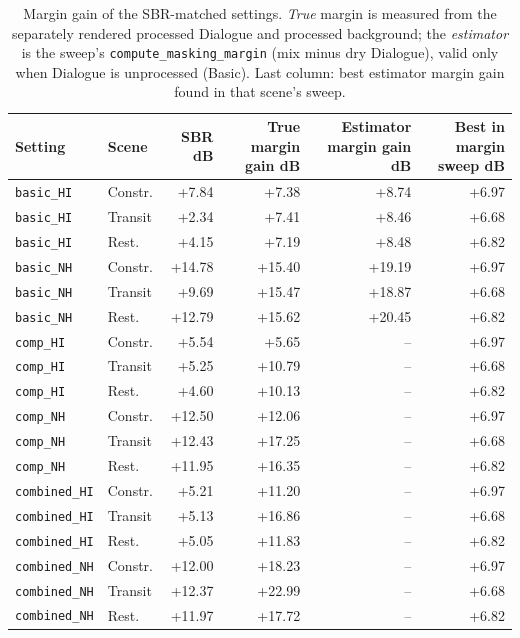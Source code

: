 \documentclass[11pt]{article}
\begin{document}
\begin{table}[H]\centering\scriptsize
\caption{Margin gain of the SBR-matched settings. \emph{True} margin is measured from the separately rendered processed Dialogue and processed background; the \emph{estimator} is the sweep's \texttt{compute\_masking\_margin} (mix minus dry Dialogue), valid only when Dialogue is unprocessed (Basic). Last column: best estimator margin gain found in that scene's sweep.}
\begin{tabular}{@{}llrrrr@{}}\toprule
Setting & Scene & SBR dB & True margin gain dB & Estimator margin gain dB & Best in margin sweep dB \\\midrule
\texttt{basic\_HI} & Constr. & +7.84 & +7.38 & +8.74 & +6.97 \\
\texttt{basic\_HI} & Transit & +2.34 & +7.41 & +8.46 & +6.68 \\
\texttt{basic\_HI} & Rest. & +4.15 & +7.19 & +8.48 & +6.82 \\
\midrule
\texttt{basic\_NH} & Constr. & +14.78 & +15.40 & +19.19 & +6.97 \\
\texttt{basic\_NH} & Transit & +9.69 & +15.47 & +18.87 & +6.68 \\
\texttt{basic\_NH} & Rest. & +12.79 & +15.62 & +20.45 & +6.82 \\
\midrule
\texttt{comp\_HI} & Constr. & +5.54 & +5.65 & -- & +6.97 \\
\texttt{comp\_HI} & Transit & +5.25 & +10.79 & -- & +6.68 \\
\texttt{comp\_HI} & Rest. & +4.60 & +10.13 & -- & +6.82 \\
\midrule
\texttt{comp\_NH} & Constr. & +12.50 & +12.06 & -- & +6.97 \\
\texttt{comp\_NH} & Transit & +12.43 & +17.25 & -- & +6.68 \\
\texttt{comp\_NH} & Rest. & +11.95 & +16.35 & -- & +6.82 \\
\midrule
\texttt{combined\_HI} & Constr. & +5.21 & +11.20 & -- & +6.97 \\
\texttt{combined\_HI} & Transit & +5.13 & +16.86 & -- & +6.68 \\
\texttt{combined\_HI} & Rest. & +5.05 & +11.83 & -- & +6.82 \\
\midrule
\texttt{combined\_NH} & Constr. & +12.00 & +18.23 & -- & +6.97 \\
\texttt{combined\_NH} & Transit & +12.37 & +22.99 & -- & +6.68 \\
\texttt{combined\_NH} & Rest. & +11.97 & +17.72 & -- & +6.82 \\
\bottomrule\end{tabular}\end{table}
\end{document}
